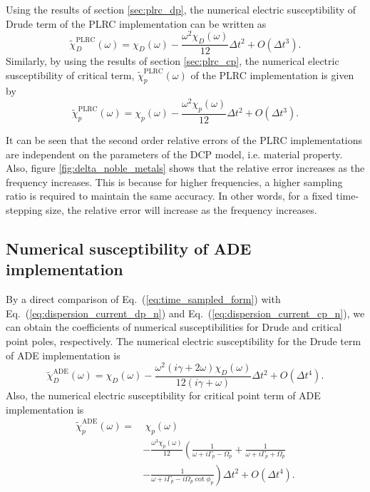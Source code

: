 Using the results of section \ref{sec:plrc_dp}, the numerical electric susceptibility of Drude term of the PLRC implementation can be written as
\begin{equation}
  \tilde{\chi}_D^{\text{PLRC}}(\omega) = \chi_D(\omega) - \frac{\omega^2 \chi_D(\omega)}{12} \Delta t^2 + O(\Delta t^3).
\end{equation}
Similarly, by using the results of section \ref{sec:plrc_cp}, the numerical electric susceptibility of critical term, $\tilde{\chi}_p^{\text{PLRC}}(\omega)$ of the PLRC implementation is given by
\begin{equation}
  \tilde{\chi}_p^{\text{PLRC}}(\omega) = \chi_p(\omega) - \frac{\omega^2 \chi_p(\omega)}{12} \Delta t^2 + O(\Delta t^3).
\end{equation}

It can be seen that the second order relative errors of the PLRC implementations are independent on the parameters of the DCP model, i.e. material property. Also, figure \ref{fig:delta_noble_metals} shows that the relative error increases as the frequency increases. This is because for higher frequencies, a higher sampling ratio is required to maintain the same accuracy. In other words, for a fixed time-stepping size, the relative error will increase as the frequency increases. 

\subsection{Numerical susceptibility of ADE implementation}
By a direct comparison of Eq.~(\ref{eq:time_sampled_form}) with Eq.~(\ref{eq:dispersion_current_dp_n}) and Eq.~(\ref{eq:dispersion_current_cp_n}), we can obtain the coefficients of numerical susceptibilities for Drude and critical point poles, respectively. The numerical electric susceptibility for the Drude term of ADE implementation is
\begin{equation}
  \tilde{\chi}_D^{\text{ADE}}(\omega) = \chi_D(\omega) - \frac{\omega^2 (i \gamma + 2 \omega) \chi_D(\omega)}{12 (i \gamma + \omega )} \Delta t^2 + O(\Delta t^4).
\end{equation}
Also, the numerical electric susceptibility for critical point term of ADE implementation is
\begin{equation}
\begin{split}
  \tilde{\chi}_p^{\text{ADE}}(\omega) = & ~ \chi_p(\omega)\\
  & - \frac{\omega^3 \chi_p(\omega)}{12} \left( \frac{1}{\omega + i \Gamma _p - \Omega _p} + \frac{1}{\omega + i \Gamma_p + \Omega_p} \right.\\ 
  & \left. - \frac{1}{\omega + i \Gamma_p - i \Omega_p \cot \phi_p} \right) \Delta t^2 + O(\Delta t^4).
\end{split}
\label{eq:tilde_chi_cp_ade}
\end{equation}

